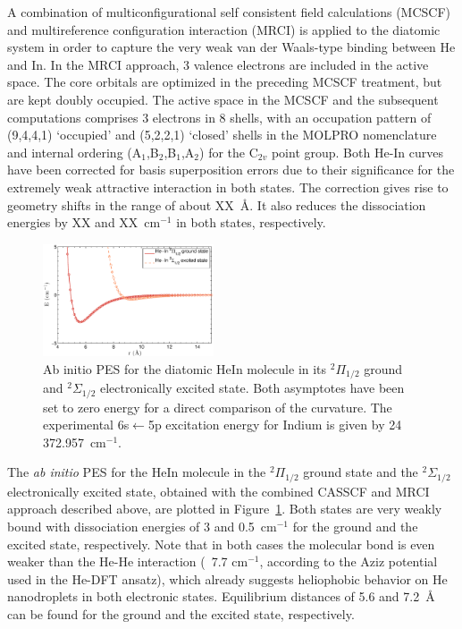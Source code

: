 \documentclass[twoside,twocolumn,9pt]{article}
\begin{document}
A combination of multiconfigurational self consistent field calculations (MCSCF\cite{Knowles1985, Werner1985}) and multireference configuration interaction (MRCI\cite{WK88, KW92}) is applied to the diatomic system in order to capture the very weak van der Waals-type binding between He and In. In the MRCI approach, 3 valence electrons are included in the active space. The core orbitals are optimized in the preceding MCSCF treatment, but are kept doubly occupied.
The active space in the MCSCF and the subsequent computations comprises 3 electrons in 8 shells, with an occupation pattern of (9,4,4,1) `occupied' and (5,2,2,1) `closed' shells in the MOLPRO nomenclature and internal ordering (A$_1$,B$_2$,B$_1$,A$_2$) for the C$_{2v}$ point group. Both He-In curves have been corrected for basis superposition errors due to their significance for the extremely weak attractive interaction in both states.\cite{boys70} The correction gives rise to geometry shifts in the range of about XX~\AA{}. It also reduces the dissociation energies by XX and XX~cm$^{-1}$ in both states, respectively.

\begin{figure}[h!]
  	\begin{center}
 		\includegraphics[width=0.45\textwidth]{1.eps}
                \caption{Ab initio PES for the diatomic HeIn molecule in its $^2\Pi{}_{1/2}$ ground and $^2\Sigma{}_{1/2}$ electronically excited state. Both asymptotes have been set to zero energy for a direct comparison of the curvature. The experimental 6s$\leftarrow{}$5p excitation energy for Indium is given by 24 372.957~cm$^{-1}$.\cite{NIST}\label{pic:pes}}
  	\end{center}
\end{figure}

The \emph{ab initio} PES for the HeIn molecule in the $^2\Pi{}_{1/2}$ ground state and the $^2\Sigma{}_{1/2}$ electronically excited state, obtained with the combined CASSCF and MRCI approach described above, are plotted in Figure~\ref{pic:pes}. Both states are very weakly bound with dissociation energies of 3 and 0.5~cm$^{-1}$ for the ground and the excited state, respectively. Note that in both cases the molecular bond is even weaker than the He-He interaction (~7.7 cm$^{-1}$, according to the Aziz potential\cite{Janzen:1997hv} used in the He-DFT ansatz), which already suggests heliophobic behavior on He nanodroplets in both electronic states.  Equilibrium distances of 5.6 and 7.2~\AA{} can be found for the ground and the excited state, respectively. 
\end{document}
